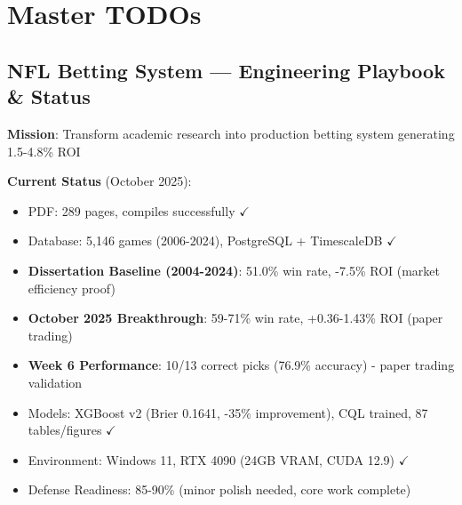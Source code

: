 \chapter*{Master TODOs}

\newcommand{\block}[1]{\par\noindent\textbf{#1}\par\vspace{0.25em}}
\newcommand{\milestone}[1]{\vspace{0.5em}\noindent\textbf{\large #1}\par\vspace{0.25em}\hrule\vspace{0.5em}}
\newcommand{\done}{\textcolor{green!60!black}{\(\checkmark\)}}
\newcommand{\wip}{\textcolor{orange!80!black}{(WIP)}}
\newcommand{\prio}[1]{\textcolor{blue!70!black}{[#1]}}
\newcommand{\blocked}{\textcolor{red!80!black}{[BLOCKED]}}

\begingroup
\RaggedRight\sloppy{}

\section*{NFL Betting System — Engineering Playbook \& Status}

\textbf{Mission}: Transform academic research into production betting system generating 1.5-4.8\% ROI

\textbf{Current Status} (October 2025):
\begin{itemize}
  \item PDF: 289 pages, compiles successfully \done
  \item Database: 5,146 games (2006-2024), PostgreSQL + TimescaleDB \done
  \item \textbf{Dissertation Baseline (2004-2024)}: 51.0\% win rate, -7.5\% ROI (market efficiency proof)
  \item \textbf{October 2025 Breakthrough}: 59-71\% win rate, +0.36-1.43\% ROI (paper trading)
  \item \textbf{Week 6 Performance}: 10/13 correct picks (76.9\% accuracy) - paper trading validation
  \item Models: XGBoost v2 (Brier 0.1641, -35\% improvement), CQL trained, 87 tables/figures \done
  \item Environment: Windows 11, RTX 4090 (24GB VRAM, CUDA 12.9) \done
  \item Defense Readiness: 85-90\% (minor polish needed, core work complete)
\end{itemize}

